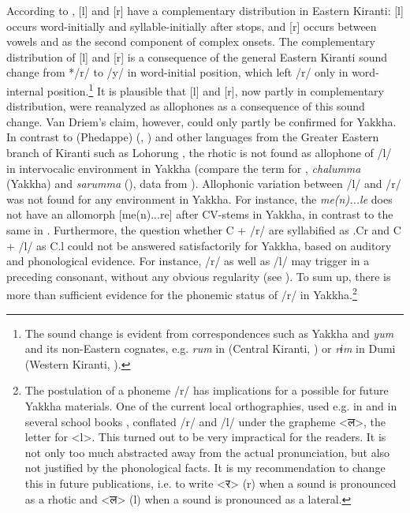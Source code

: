According to  \cite{Driem1990The-fall}, [l] and [r] have a complementary distribution in Eastern Kiranti: [l] occurs word-initially and syllable-initially after stops, and [r] occurs between vowels and as the second component of complex onsets. The complementary distribution of [l] and [r] is a consequence of the general Eastern Kiranti sound change from */r/ to /y/ in word-initial position, which left /r/ only in word-internal position.\footnote{The sound change is evident from correspondences such as Yakkha and  \emph{yum}  and its non-Eastern cognates, e.g. \emph{rum} in  (Central Kiranti, \citealt[393]{Bickeletal2009Puma}) or \emph{rɨm} in Dumi (Western Kiranti, \citealt[412]{Driem1993A-grammar}).} It is plausible that [l] and [r], now partly in complementary distribution, were reanalyzed as allophones as a consequence of this sound change.  Van Driem's claim, however, could only partly be confirmed for Yakkha. In contrast to (Phedappe)  (\citealt{Driem1987A-grammar}, \citealt[688ff]{Schieringetal2010The-prosodic})  and other languages from the Greater Eastern branch of Kiranti such as Lohorung \citep[85]{Driem1990The-fall}, the rhotic is not found as allophone of /l/ in intervocalic environment in Yakkha (compare the term for , \emph{chalumma} (Yakkha) and \emph{sarumma} (),  data from \citet[131]{Driem1985_LimbuKin}). Allophonic variation between /l/ and /r/ was not found for any environment in Yakkha. For instance, the  \emph{me(n)...le} does not have an allomorph [me(n)...re] after CV-stems in Yakkha, in contrast to the same  in . Furthermore, the question whether C + /r/ are syllabified as .Cr and C + /l/ as C.l could not be answered satisfactorily for Yakkha, based on auditory and phonological evidence. For instance, /r/ as well as /l/ may trigger  in a preceding consonant, without any obvious regularity (see ). To sum up, there is more than sufficient evidence for the phonemic status of /r/ in Yakkha.\footnote{The postulation of a phoneme /r/ has implications for a possible  for future Yakkha materials. One of the current local orthographies, used e.g. in \citet{Kongren2007Yakkha} and in several school books \citep{Jimi2009Engka-Yakkha}, conflated /r/ and /l/ under the grapheme <{\Deva ल}>, the  letter for <l>. This turned out to be very impractical for the readers. It is not only too much abstracted away from the actual pronunciation, but also not justified by the phonological facts. It is my recommendation to change this in future publications, i.e. to write <{\Deva र}> (r) when a sound is pronounced as a rhotic and <{\Deva ल}> (l) when a sound is pronounced as a lateral.}



